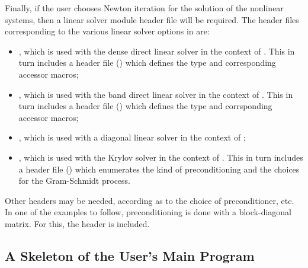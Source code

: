 Finally, if the user chooses Newton iteration for the solution of the nonlinear systems,
then a linear solver module header file will be required. 
The header files corresponding to the various linear solver options in {\cvodes} are:
%
\begin{itemize}
\item {}, 
  which is used with the dense direct linear solver in 
  the context of {\cvodes}. This in turn includes a header file ()
  which defines the  type and corresponding accessor macros; 
\item {}, 
  which is used with the band direct linear solver in the
  context of {\cvodes}. This in turn includes a header file ()
  which defines the  type and corrsponding accessor macros;
\item {}, which is used with a diagonal linear solver in the
  context of {\cvodes};
\item {}, 
  which is used with the Krylov solver {\spgmr} in the
  context of {\cvodes}. This in turn includes a header file ()
  which enumerates the kind of preconditioning and the choices for the
  Gram-Schmidt process.
\end{itemize}

Other headers may be needed, according as to the choice of
preconditioner, etc. In one of the examples to follow, preconditioning
is done with a block-diagonal matrix. For this, the header
 is included.


\subsection{A Skeleton of the User's Main Program}\label{ss:skeleton_sim}

